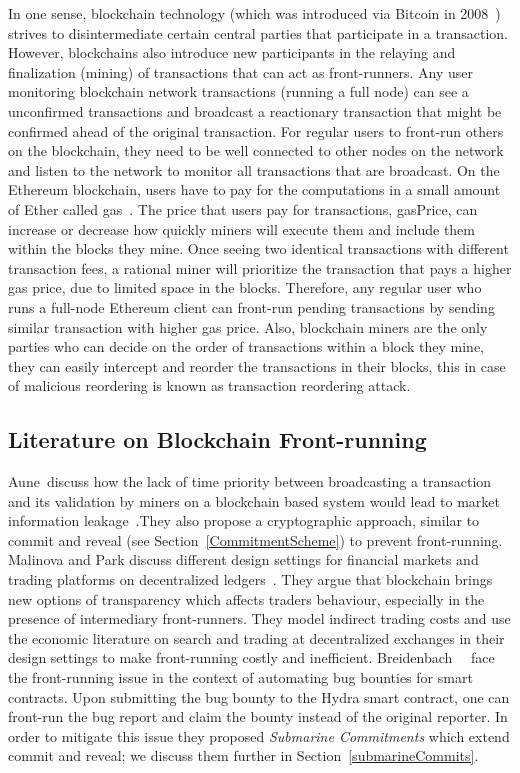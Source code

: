 In one sense, blockchain technology (which was introduced via Bitcoin in 2008~\cite{nakamoto2008bitcoin}) strives to disintermediate certain central parties that participate in a transaction. However, blockchains also introduce new participants in the relaying and finalization (\ie mining) of transactions that can act as front-runners. Any user monitoring blockchain network transactions (\eg running a full node) can see a unconfirmed transactions and broadcast a reactionary transaction that might be confirmed ahead of the original transaction. For regular users to front-run others on the blockchain, they need to be well connected to other nodes on the network and listen to the network to monitor all transactions that are broadcast. On the Ethereum blockchain, users have to pay for the computations in a small amount of Ether called \textsf{gas}~\cite{AccountT67:online}. The price that users pay for transactions, \textsf{gasPrice}, can increase or decrease how quickly miners will execute them and include them within the blocks they mine. Once seeing two identical transactions with different transaction fees, a rational miner will prioritize the transaction that pays a higher gas price, due to limited space in the blocks. Therefore, any regular user who runs a full-node Ethereum client can front-run pending transactions by sending similar transaction with higher gas price. Also, blockchain miners are the only parties who can decide on the order of transactions within a block they mine, they can easily intercept and reorder the transactions in their blocks, this in case of malicious reordering is known as \textsf{transaction reordering} attack. 

\subsection{Literature on Blockchain Front-running}

Aune~\etal discuss how the lack of time priority between broadcasting a transaction and its validation by miners on a blockchain based system would lead to market information leakage~\cite{aune2017footprints}.They also propose a cryptographic approach, similar to commit and reveal (see Section~\ref{CommitmentScheme}) to prevent front-running. Malinova and Park discuss different design settings for financial markets and trading platforms on decentralized ledgers~\cite{malinova2017market}. They argue that blockchain brings new options of transparency which affects traders behaviour, especially in the presence of intermediary front-runners. They model indirect trading costs and use the economic literature on search and trading at decentralized exchanges in their design settings to make front-running costly and inefficient. Breidenbach~\etal~\cite{breidenbach2018enter} face the front-running issue in the context of automating bug bounties for smart contracts. Upon submitting the bug bounty to the Hydra smart contract, one can front-run the bug report and claim the bounty instead of the original reporter. In order to mitigate this issue they proposed \textit{Submarine Commitments} which extend commit and reveal; we discuss them further in Section~\ref{submarineCommits}.

